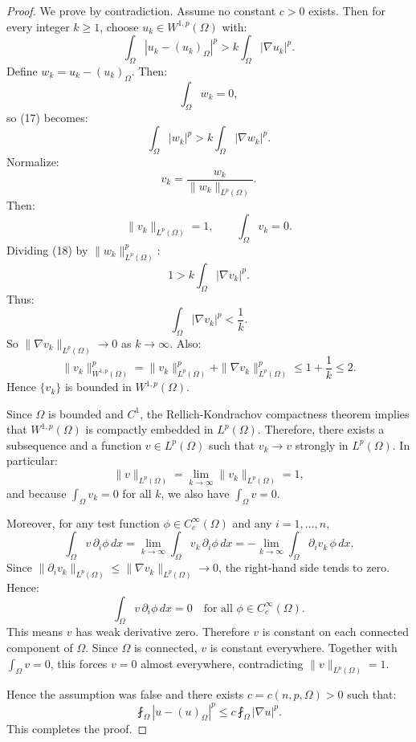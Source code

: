 \begin{proof}
We prove by contradiction. Assume no constant $c>0$ exists. Then for every integer $k\ge 1$, choose $u_k\in W^{1,p}(\Omega)$ with:
\[
\int_\Omega |u_k-(u_k)_\Omega|^p > k\int_\Omega |\nabla u_k|^p.
\tag{17}
\]
Define $w_k= u_k-(u_k)_\Omega$. Then:
\[
\int_\Omega w_k = 0,
\]
so (17) becomes:
\[
\int_\Omega |w_k|^p > k\int_\Omega |\nabla w_k|^p.
\tag{18}
\]
Normalize:
\[
v_k = \frac{w_k}{\|w_k\|_{L^p(\Omega)}}.
\]
Then:
\[
\|v_k\|_{L^p(\Omega)} = 1, \qquad \int_\Omega v_k = 0.
\]
Dividing (18) by $\|w_k\|_{L^p(\Omega)}^p$:
\[
1 > k \int_\Omega |\nabla v_k|^p.
\]
Thus:
\[
\int_\Omega |\nabla v_k|^p < \frac{1}{k}.
\]
So $\|\nabla v_k\|_{L^p(\Omega)} \to 0$ as $k\to\infty$. Also:
\[
\|v_k\|_{W^{1,p}(\Omega)}^p = \|v_k\|_{L^p(\Omega)}^p + \|\nabla v_k\|_{L^p(\Omega)}^p \le 1+\frac{1}{k} \le 2.
\]
Hence $\{v_k\}$ is bounded in $W^{1,p}(\Omega)$.

Since $\Omega$ is bounded and $C^1$, the Rellich-Kondrachov compactness theorem implies that $W^{1,p}(\Omega)$ is compactly embedded in $L^p(\Omega)$. Therefore, there exists a subsequence and a function $v\in L^p(\Omega)$ such that $v_k\to v$ strongly in $L^p(\Omega)$. In particular:
\[
\|v\|_{L^p(\Omega)} = \lim_{k\to\infty}\|v_k\|_{L^p(\Omega)}=1,
\]
and because $\int_\Omega v_k = 0$ for all $k$, we also have $\int_\Omega v = 0$.

Moreover, for any test function $\phi\in C_c^\infty(\Omega)$ and any $i=1,\dots,n$,
\[
\int_\Omega v\,\partial_i\phi\, dx
=\lim_{k\to\infty}\int_\Omega v_k\,\partial_i\phi\, dx
=-\lim_{k\to\infty}\int_\Omega \partial_i v_k\,\phi\, dx.
\]
Since $\|\partial_i v_k\|_{L^p(\Omega)} \le \|\nabla v_k\|_{L^p(\Omega)} \to 0$, the right-hand side tends to zero. Hence:
\[
\int_\Omega v\,\partial_i\phi\, dx = 0 \quad \text{for all } \phi\in C_c^\infty(\Omega).
\]
This means $v$ has weak derivative zero. Therefore $v$ is constant on each connected component of $\Omega$. Since $\Omega$ is connected, $v$ is constant everywhere. Together with $\int_\Omega v = 0$, this forces $v=0$ almost everywhere, contradicting $\|v\|_{L^p(\Omega)}=1$.

Hence the assumption was false and there exists $c=c(n,p,\Omega)>0$ such that:
\[
\fint_\Omega |u-(u)_\Omega|^p \le c\fint_\Omega |\nabla u|^p.
\]
This completes the proof.
\end{proof}

